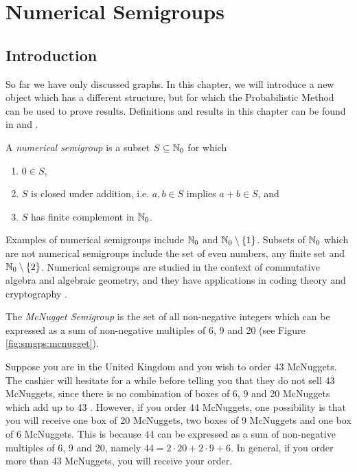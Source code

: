 \chapter{Numerical Semigroups}\label{chap:numsems}

\section{Introduction}\label{sec:smgps:intro}

So far we have only discussed graphs. In this chapter, we will introduce a new object which has a different structure, but for which the Probabilistic Method can be used to prove results. Definitions and results in this chapter can be found in \cite{rosales2009numerical} and \cite{assi2020numerical}. \par

\begin{definition} 
    A \textit{numerical semigroup} is a subset $S \subseteq \mathbb{N}_{0}$ for which 
    \begin{enumerate}
        \item $0 \in S$,
        \item $S$ is closed under addition, i.e. $a, b \in S$ implies $a + b \in S$, and
        \item $S$ has finite complement in $\mathbb{N}_{0}$.
    \end{enumerate}
\end{definition}

Examples of numerical semigroups include $\mathbb{N}_{0}$ and $\mathbb{N}_{0} \setminus \{1\}$. Subsets of $\mathbb{N}_0$ which are not numerical semigroups include the set of even numbers, any finite set and $\mathbb{N}_0 \setminus \{2\}$. Numerical semigroups are studied in the context of commutative algebra and algebraic geometry, and they have applications in coding theory and cryptography \cite{assi2020numerical}. \par

\begin{example}\label{ex:smgps:mcnugget}
    The \textit{McNugget Semigroup} is the set of all non-negative integers which can be expressed as a sum of non-negative multiples of 6, 9 and 20 (see Figure \ref{fig:smgps:mcnugget}).
\end{example}

Suppose you are in the United Kingdom and you wish to order 43 McNuggets. The cashier will hesitate for a while before telling you that they do not sell 43 McNuggets, since there is no combination of boxes of 6, 9 and 20 McNuggets which add up to 43 \cite{youtube}. However, if you order 44 McNuggets, one possibility is that you will receive one box of 20 McNuggets, two boxes of 9 McNuggets and one box of 6 McNuggets. This is because 44 can be expressed as a sum of non-negative multiples of 6, 9 and 20, namely $44 = 2 \cdot 20 + 2 \cdot 9 + 6$. In general, if you order more than 43 McNuggets, you will receive your order. \par

